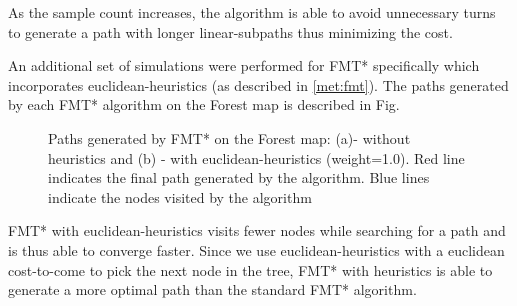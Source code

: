 \documentclass{article}
\begin{document}
As the sample count increases, the algorithm is able to avoid unnecessary turns to generate a path with longer linear-subpaths thus minimizing the cost.

An additional set of simulations were performed for FMT* specifically which incorporates euclidean-heuristics (as described in \ref{met:fmt}). The paths generated by each FMT* algorithm on the Forest map is described in Fig.

\begin{figure}[H]
	\caption{Paths generated by FMT* on the Forest map: (a)- without heuristics and (b) - with euclidean-heuristics (weight=1.0). Red line indicates the final path generated by the algorithm. Blue lines indicate the nodes visited by the algorithm}
	\label{fmt:nsamples}
\end{figure}

FMT* with euclidean-heuristics visits fewer nodes while searching for a path and is thus able to converge faster. Since we use euclidean-heuristics with a euclidean cost-to-come to pick the next node in the tree, FMT* with heuristics is able to generate a more optimal path than the standard FMT* algorithm.
\end{document}
